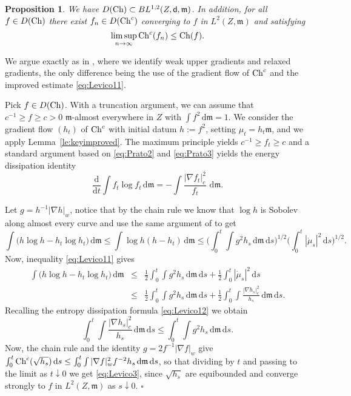 \documentclass[reqno,11pt]{article}
\numberwithin{equation}{section}
\newcommand{\C}{\mathbb{C}}
\newcommand{\mm}{{\mbox{\boldmath$m$}}}
\newcommand{\sfd}{{\sf d}}
\renewcommand{\d}{{\mathrm d}}
\newenvironment{proof}{\removelastskip\par\medskip   %
\noindent{\em Proof.}
\rm}{\penalty-20\null\hfill$\square$\par\medbreak}
\newtheorem{proposition}[theorem]{Proposition}
\newcommand{\weakgrad}[1]{|\nabla #1|_w}                %
\newcommand{\cartgrad}[1]{|\nabla #1|_c}
\renewcommand{\C}{{\rm Ch}}
\renewcommand{\mm}{\mathfrak m}
\begin{document}
\begin{proposition}\label{prop:Levico1}
We have $D(\C)\subset BL^{1,2}(Z,\sfd,\mm)$. In addition, for all
$f\in D(\C)$ there exist $f_n\in D(\C^c)$ converging to $f$ in
$L^2(Z,\mm)$ and satisfying
\begin{equation}\label{eq:Levico3}
\limsup_{n\to\infty}\C^c(f_n)\leq\C(f).
\end{equation}
\end{proposition}
\begin{proof} We argue exactly as in
\cite[Theorem~6.2]{Ambrosio-Gigli-Savare11}, where we identify weak
upper gradients and relaxed gradients, the only difference being the
use of the gradient flow of $\C^c$ and the improved estimate
\eqref{eq:Levico11}.

Pick $f\in D(\C)$. With a truncation argument, we can assume that
$c^{-1}\ge f\ge c>0$ $\mm$-almost everywhere in $Z$ with $\int
f^2\,\d\mm=1$. We consider the gradient flow $(h_t)$ of $\C^c$ with
initial datum $h:=f^2$, setting $\mu_t=h_t\mm$, and we apply
Lemma~\ref{le:keyimproved}. The maximum principle yields $c^{-1}\geq
f_t\geq c$ and a standard argument based on \eqref{eq:Prato2} and
\eqref{eq:Prato3} yields the energy dissipation identity
\begin{equation}\label{eq:Levico12}
\frac{\d}{\d t}\int f_t\log
f_t\,\d\mm=-\int\frac{\cartgrad{f_t}^2}{f_t}\,\,\d\mm.
\end{equation}

Let $g=h^{-1}\weakgrad h$, notice that by the chain rule we know
that $\log h$ is Sobolev along almost every curve and use the same
argument of \cite[Theorem~6.2]{Ambrosio-Gigli-Savare11} to get
$$
\int\big(h\log h-h_t \log h_t\big)\,\d\mm\leq\int \log
h(h-h_t)\,\d\mm\leq \Big(\int_0^t\int g^2 h_s\,\d\mm\,\d s
\Big)^{1/2}\Big(
  \int_0^t|\dot \mu_s|^2\,\d s\Big)^{1/2}.
$$
Now, inequality \eqref{eq:Levico11} gives
\begin{eqnarray*}
  \int\big(h\log h-h_t \log h_t\big)\,\d\mm&\le&
  \frac 12 \int_0^t\int  g^2 h_s\,\d\mm\,\d s+
  \frac 12 \int_0^t |\dot\mu_s|^2\,\d s
  \\&\le&
  \frac 12 \int_0^t\int  g^2 h_s\,\d\mm\,\d s+
  \frac 12 \int_0^t \int\frac{\cartgrad{h_s}^2}{h_s}\,\d\mm\,\d s.
\end{eqnarray*}
Recalling the entropy dissipation formula \eqref{eq:Levico12} we
obtain
$$
  \int_0^t \int\frac {\cartgrad{h_s}^2}{h_s}\,\d\mm\,\d s
  \le \int_0^t\int g^2h_s\,\d\mm\,\d s.
$$
Now, the chain rule and the identity $g=2f^{-1}\weakgrad f$ give
$\int_0^t\C^c(\sqrt{h_s})\,\d s\leq\int_0^t\int\weakgrad f^2f^{-2}
h_s\,\d\mm\,\d s$, so that dividing by $t$ and passing to the limit
as $t\downarrow0$ we get \eqref{eq:Levico3}, since $\sqrt{h_s}$ are
equibounded and converge strongly to $f$ in $L^2(Z,\mm)$ as
$s\downarrow0$.
\end{proof}
\end{document}
